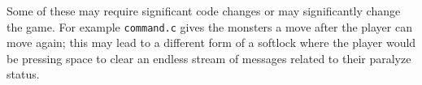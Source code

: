 \documentclass[12pt,a4paper]{article}
\begin{document}
Some of these may require significant code changes or may significantly
change the game. For example \texttt{command.c} gives the monsters a
move after the player can move again; this may lead to a different form
of a softlock where the player would be pressing space to clear an
endless stream of messages related to their paralyze status.
\end{document}
